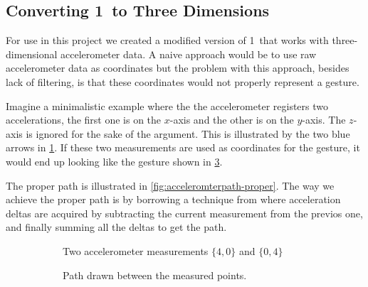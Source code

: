 \subsection{Converting 1\textcent~to Three Dimensions}
For use in this project we created a modified version of 1\textcent~that works with three-dimensional accelerometer data.
A naive approach would be to use raw accelerometer data as coordinates but the problem with this approach, besides lack of filtering, is that these coordinates would not properly represent a gesture.

Imagine a minimalistic example where the the accelerometer registers two accelerations, the first one is on the $x$-axis and the other is on the $y$-axis.
The $z$-axis is ignored for the sake of the argument.
This is illustrated by the two blue arrows in \cref{fig:accelerometerpoints}.
If these two measurements are used as coordinates for the gesture, it would end up looking like the gesture shown in \cref{fig:accelerometerpath}.

The proper path is illustrated in \cref{fig:acceleromterpath-proper}.
The way we achieve the proper path is by borrowing a technique from \cite{threedollar} where acceleration deltas are acquired by subtracting the current measurement from the previos one, and finally summing all the deltas to get the path.

\begin{figure}
    \begin{subfigure}{.5\linewidth}
    \caption{Two accelerometer measurements $\{4,0\}$ and $\{0,4\}$}
\label{fig:accelerometerpoints}
    \end{subfigure}
    \begin{subfigure}{.5\linewidth}
    \caption{Path drawn between the measured points.}
\label{fig:accelerometerpath}
    \end{subfigure}
\caption{ }
\end{figure}

